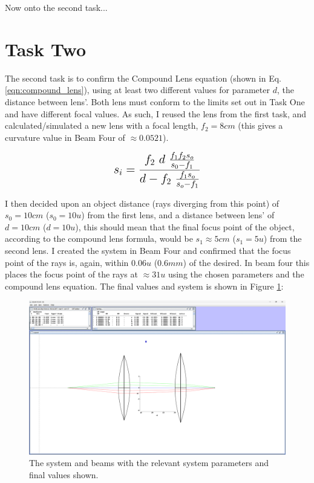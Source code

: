 \documentclass[colorlinks,11pt,a4paper,normalphoto,withhyper,ragged2e]{altareport}
\begin{document}
		Now onto the second task... \linebreak
		
		
		
		
	\section{Task Two}
		\begin{paracol}{2}
			The second task is to confirm the Compound Lens equation (shown in Eq. \ref{eqn:compound_lens}), using at least two different values for parameter $d$, the distance between lens'. Both lens must conform to the limits set out in Task One and have different focal values. As such, I reused the lens from the first task, and calculated/simulated a new lens with a focal length, $f_2=8cm$ (this gives a curvature value in Beam Four of $\approx 0.0521$). \linebreak
			
		\switchcolumn
		
		\begin{equation}
			\mathlarger{\mathlarger{s_i = \frac{f_2 \ d \ \frac{f_1 f_2 s_o}{s_0 - f_1}}{d - f_2 \ \frac{f_1 s_o}{s_o - f_1}}}}
		\end{equation}\label{eqn:compound_lens}
		
		\end{paracol}
		
		I then decided upon an object distance (rays diverging from this point) of $s_0 = 10cm$ ($s_0 = 10u$) from the first lens, and a distance between lens' of $d=10cm$ ($d = 10u$), this should mean that the final focus point of the object, according to the compound lens formula, would be $s_1 \approx 5cm$ ($s_1 = 5u$) from the second lens. I created the system in Beam Four and confirmed that the focus point of the rays is, again, within $0.06u$ ($0.6mm$) of the desired. In beam four this places the focus point of the rays at $\approx 31u$ using the chosen parameters and the compound lens equation. The final values and system is shown in Figure \ref{fig:t2a}: \linebreak
		
		\begin{figure}[h]
			\centering
			\includegraphics[width=0.75\linewidth]{Images/T2a-obj-10cm-d-10cm-Full-Window.png}
			\caption{\centering\footnotesize The system and beams with the relevant system parameters and final values shown.}
			\label{fig:t2a}
		\end{figure}
		
\end{document}
